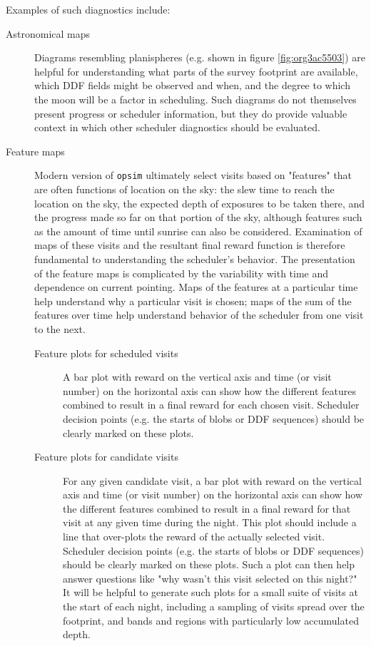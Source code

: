 Examples of such diagnostics include:
\begin{description}
\item[{Astronomical maps}] Diagrams resembling planispheres (e.g. shown in figure \ref{fig:org3ac5503}) are helpful for understanding what parts of the survey footprint are available, which DDF fields might be observed and when, and the degree to which the moon will be a factor in scheduling. Such diagrams do not themselves present progress or scheduler information, but they do provide valuable context in which other scheduler diagnostics should be evaluated.
\item[{Feature maps}] Modern version of \texttt{opsim} ultimately select visits based on "features" that are often functions of location on the sky: the slew time to reach the location on the sky, the expected depth of exposures to be taken there, and the progress made so far on that portion of the sky, although features such as the amount of time until sunrise can also be considered. Examination of maps of these visits and the resultant final reward function is therefore fundamental to understanding the scheduler's behavior. The presentation of the feature maps is complicated by the variability with time and dependence on current pointing. Maps of the features at a particular time help understand why a particular visit is chosen; maps of the sum of the features over time help understand behavior of the scheduler from one visit to the next. 
\begin{description}
\item[{Feature plots for scheduled visits}] A bar plot with reward on the vertical axis and time (or visit number) on the horizontal axis can show how the different features combined to result in a final reward for each chosen visit. Scheduler decision points (e.g. the starts of blobs or DDF sequences) should be clearly marked on these plots.
\item[{Feature plots for candidate visits}] For any given candidate visit, a bar plot with reward on the vertical axis and time (or visit number) on the horizontal axis can show how the different features combined to result in a final reward for that visit at any given time during the night. This plot should include a line that over-plots the reward of the actually selected visit.  Scheduler decision points (e.g. the starts of blobs or DDF sequences) should be clearly marked on these plots. Such a plot can then help answer questions like "why wasn't this visit selected on this night?" It will be helpful to generate such plots for a small suite of visits at the start of each night, including a sampling of visits spread over the footprint, and bands and regions with particularly low accumulated depth.

\end{description}
\end{description}
